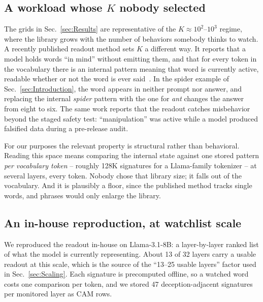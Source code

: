 \documentclass[conference]{IEEEtran}
\newcommand{\cam}{{CAM}\xspace}
\begin{document}
\subsection{A workload whose $K$ nobody selected}
\label{subsec:Jspace}
The grids in Sec.~\ref{sec:Results} are representative of the
$K\approx10^{2}$--$10^{3}$ regime, where the library grows with the
number of behaviors somebody thinks to watch. A recently published
readout method sets $K$ a different way. It reports that a model holds words ``in
mind'' without emitting them, and that for every token in the vocabulary
there is an internal pattern meaning that word is currently active,
readable whether or not the word is ever
said~\cite{anthropic2026workspace}. In the spider example of
Sec.~\ref{sec:Introduction}, the word appears in neither prompt nor
answer, and replacing the internal \emph{spider} pattern with the one
for \emph{ant} changes the answer from eight to six. The same work
reports that the readout catches misbehavior beyond the staged safety
test: ``manipulation'' was active while a model produced falsified
data during a pre-release audit.

For our purposes the relevant property is structural rather than
behavioral. Reading this space means comparing the internal state against
one stored pattern \emph{per vocabulary token} -- roughly 128K signatures
for a Llama-family tokenizer -- at several layers, every token. Nobody
chose that library size; it falls out of the vocabulary. And it is
plausibly a floor, since the published method tracks single words, and
phrases would only enlarge the library.

\subsection{An in-house reproduction, at watchlist scale}
\label{subsec:Watchlist}
We reproduced the readout in-house on Llama-3.1-8B: a layer-by-layer
ranked list of what the model is currently representing. About 13 of 32
layers carry a usable readout at this scale, which is the source of the
``13--25 usable layers'' factor used in Sec.~\ref{sec:Scaling}. Each
signature is precomputed offline, so a watched word costs one comparison
per token, and we stored 47 deception-adjacent signatures per monitored
layer as \cam rows.
\end{document}
